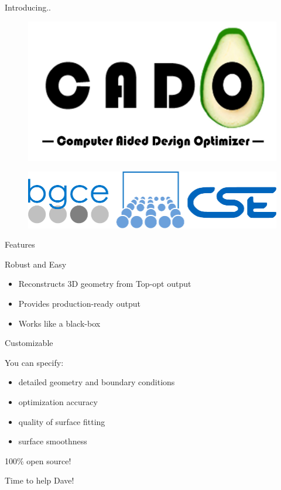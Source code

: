 \begin{frame}{Introducing..}
	\begin{figure}
	\centering
	\includegraphics[scale=0.2]{Pictures/FirstHalf/cado_logo_text.jpg}
	\end{figure}
	\begin{figure}
	\centering
	\includegraphics[scale=0.35]{Pictures/FirstHalf/sccs_os2.pdf}
	\end{figure}
\end{frame}

\begin{frame}{Features}
	\begin{block}{Robust and Easy}{
			\begin{itemize}
				\item Reconstructs 3D geometry from Top-opt output
				\item Provides production-ready output
				\item Works like a black-box
			\end{itemize}
		}
	\end{block}
	\begin{block}{Customizable}{
			You can specify:
			\begin{itemize}
				\item detailed geometry and boundary conditions
				\item optimization accuracy
				\item quality of surface fitting
				\item surface smoothness
			\end{itemize}
		}
	\end{block}
	\begin{block}{100\% open source!}{
		}
	\end{block}
\end{frame}

\begin{frame}{Time to help Dave!}
\end{frame}